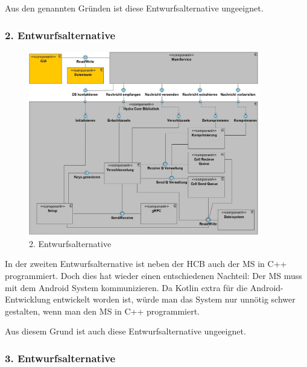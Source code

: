 Aus den genannten Gründen ist diese Entwurfsalternative ungeeignet.

\subsubsection{2. Entwurfsalternative}

\begin{figure}[h]
  \centering
     \includegraphics[width=0.9\textwidth]{diagramme/Component_Diagram_E3.jpg}
  \caption{2. Entwurfsalternative}
  \label{fig:Bild3}
\end{figure}

In der zweiten Entwurfsalternative ist neben der \ac{HCB} auch der \ac{MS} in C++ programmiert. Doch dies hat wieder einen entschiedenen Nachteil: Der \ac{MS} muss mit dem Android System kommunizieren. Da Kotlin extra für die Android-Entwicklung entwickelt worden ist, würde man das System nur unnötig schwer gestalten, wenn man den \ac{MS} in C++ programmiert. 

Aus diesem Grund ist auch diese Entwurfsalternative ungeeignet.
\newpage
\subsubsection{3. Entwurfsalternative}

